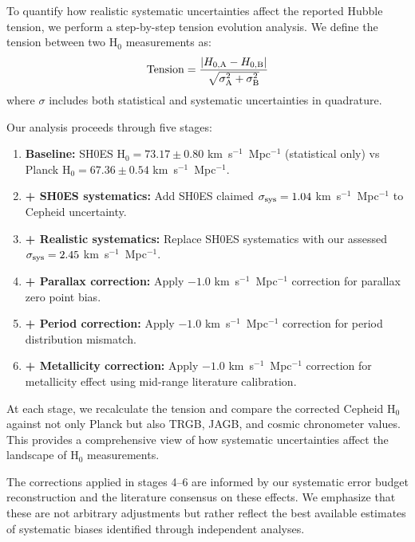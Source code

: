 \documentclass[twocolumn, linenumbers]{aastex701}
\begin{document}
To quantify how realistic systematic uncertainties affect the reported Hubble tension, we perform a step-by-step tension evolution analysis. We define the tension between two H$_0$ measurements as:
\begin{equation}
{\rm Tension} = \frac{|H_{0,\rm A} - H_{0,\rm B}|}{\sqrt{\sigma_{\rm A}^2 + \sigma_{\rm B}^2}}
\end{equation}
where $\sigma$ includes both statistical and systematic uncertainties in quadrature.

Our analysis proceeds through five stages:

\begin{enumerate}
\item \textbf{Baseline:} SH0ES H$_0 = 73.17 \pm 0.80$ km~s$^{-1}$~Mpc$^{-1}$ (statistical only) vs Planck H$_0 = 67.36 \pm 0.54$ km~s$^{-1}$~Mpc$^{-1}$.

\item \textbf{+ SH0ES systematics:} Add SH0ES claimed $\sigma_{\rm sys} = 1.04$ km~s$^{-1}$~Mpc$^{-1}$ to Cepheid uncertainty.

\item \textbf{+ Realistic systematics:} Replace SH0ES systematics with our assessed $\sigma_{\rm sys} = 2.45$ km~s$^{-1}$~Mpc$^{-1}$.

\item \textbf{+ Parallax correction:} Apply $-1.0$ km~s$^{-1}$~Mpc$^{-1}$ correction for parallax zero point bias.

\item \textbf{+ Period correction:} Apply $-1.0$ km~s$^{-1}$~Mpc$^{-1}$ correction for period distribution mismatch.

\item \textbf{+ Metallicity correction:} Apply $-1.0$ km~s$^{-1}$~Mpc$^{-1}$ correction for metallicity effect using mid-range literature calibration.
\end{enumerate}

At each stage, we recalculate the tension and compare the corrected Cepheid H$_0$ against not only Planck but also TRGB, JAGB, and cosmic chronometer values. This provides a comprehensive view of how systematic uncertainties affect the landscape of H$_0$ measurements.

The corrections applied in stages 4--6 are informed by our systematic error budget reconstruction and the literature consensus on these effects. We emphasize that these are not arbitrary adjustments but rather reflect the best available estimates of systematic biases identified through independent analyses.
\end{document}
